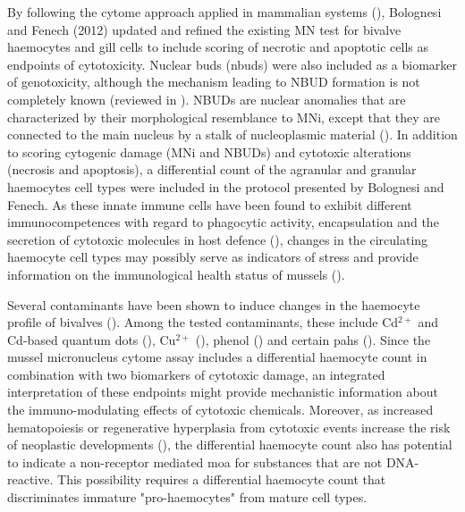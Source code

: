 By following the cytome approach applied in mammalian systems (\cite{Fenech2007}), Bolognesi and Fenech (2012) updated and refined the existing MN test for bivalve haemocytes and gill cells to include scoring of necrotic and apoptotic cells as endpoints of cytotoxicity. Nuclear buds (\acrshort{nbuds}) were also included as a biomarker of genotoxicity, although the mechanism leading to NBUD formation is not completely known (reviewed in \cite{Fenech2011}). NBUDs are nuclear anomalies that are characterized by their morphological resemblance to MNi, except that they are connected to the main nucleus by a stalk of nucleoplasmic material (\cite{Fenech2002}). In addition to scoring cytogenic damage (MNi and NBUDs) and cytotoxic alterations (necrosis and apoptosis), a differential count of the agranular and granular haemocytes cell types were included in the protocol presented by Bolognesi and Fenech. As these innate immune cells have been found to exhibit different immunocompetences with regard to phagocytic activity, encapsulation and the secretion of cytotoxic molecules in host defence (\cite{delaBallina2022}), changes in the circulating haemocyte cell types may possibly serve as indicators of stress and provide information on the immunological health status of mussels (\cite{Couch1993}).

Several contaminants have been shown to induce changes in the haemocyte profile of bivalves (\cite{Couch1993}). Among the tested contaminants, these include Cd$^{2+}$ and Cd-based quantum dots (\cite{Rocha2014, Auffret1994}), Cu$^{2+}$ (\cite{Pipe1995, Pipe1999}), phenol (\cite{Fries1980}) and certain \acrshort{pahs} (\cite{Dyrynda1998, Dyrynda2000}). Since the mussel micronucleus cytome assay includes a differential haemocyte count in combination with two biomarkers of cytotoxic damage, an integrated interpretation of these endpoints might provide mechanistic information about the immuno-modulating effects of cytotoxic chemicals. Moreover, as increased hematopoiesis or regenerative hyperplasia from cytotoxic events increase the risk of neoplastic developments (\cite{Eastmond2012}), the differential haemocyte count also has potential to indicate a non-receptor mediated \acrshort{moa} for substances that are not DNA-reactive. This possibility requires a differential haemocyte count that discriminates immature "pro-haemocytes" from mature cell types.

